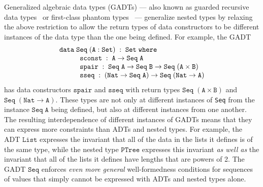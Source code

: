 \documentclass{lmcs}
\theoremstyle{plain}\newtheorem{satz}[thm]{Satz}
\begin{document}
Generalized algebraic data types (GADTs) --- also known as guarded
recursive data types~\cite{xcc03} or first-class phantom
types~\cite{ch03} --- generalize nested types by relaxing the above
restriction to allow the return types of data constructors to be
different instances of the data type than the one being defined. For
example, the GADT
\[\begin{array}{l}
\mathtt{data\; Seq \;(A : Set)\;:\;Set\;where}\\
\hspace*{0.4in}\mathtt{sconst\;:\; A \rightarrow Seq\;A}\\
\hspace*{0.4in}\mathtt{spair\;:\;Seq\;A \rightarrow Seq\;B \rightarrow
  Seq\;(A\times B)}\\
\hspace*{0.4in}\mathtt{sseq\;:\;(Nat \rightarrow Seq\;A) \rightarrow
  Seq\;(Nat \to A)}
\end{array}\]
\noindent
has data constructors $\mathtt{spair}$ and $\mathtt{sseq}$ with
return types $\mathtt{Seq\; (A \times B)}$ and $\mathtt{Seq\;(Nat \to
  A)}$. These types are not only at different instances of \verb|Seq|
from the instance $\mathtt{Seq\; A}$ being defined, but also at
different instances from one another. The resulting interdependence of
different instances of GADTs means that they can express more
constraints than ADTs and nested types. For example, the ADT
$\mathtt{List}$ expresses the invariant that all of the data in the
lists it defines is of the same type, while the nested type
$\mathtt{PTree}$ expresses this invariant {\em as well as} the
invariant that all of the lists it defines have lengths that are
powers of 2. The GADT $\mathtt{Seq}$ enforces {\em even more general}
well-formedness conditions for sequences of values that simply cannot
be expressed with ADTs and nested types alone.
\end{document}
